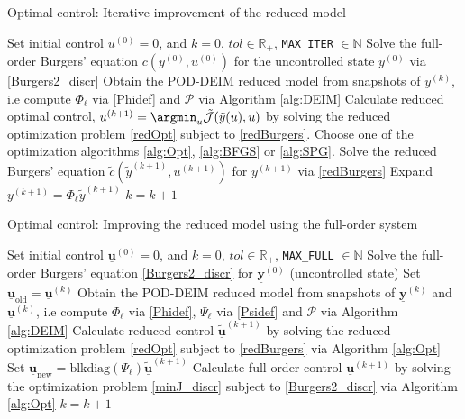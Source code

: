 \begin{algorithm}[H]
\caption{Optimal control: Iterative improvement of the reduced model}
\label{alg:Opt+MOR1}
\begin{algorithmic}[1]
\STATE Set initial control $u^{(0)} = 0$, and $k = 0$, $tol \in \mathbb{R}_+$, \texttt{MAX\_ITER} $\in \mathbb{N}$
\STATE Solve the full-order Burgers' equation $c(y^{(0)},u^{(0)})$ for the uncontrolled state $y^{(0)}$ via \eqref{Burgers2_discr}
\STATE Obtain the POD-DEIM reduced model from snapshots of $y^{(k)}$, i.e compute $\Phi_\ell$ via \eqref{Phidef} and $\mathcal{P}$ via Algorithm \ref{alg:DEIM}
\STATE Calculate reduced optimal control, $u^{(k+1)} = \argmin_u \tilde{\mathcal J}(\tilde{y}(u),u)$ by solving the reduced optimization problem \eqref{redOpt} subject to \eqref{redBurgers}. Choose one of the optimization algorithms \ref{alg:Opt}, \ref{alg:BFGS} or \ref{alg:SPG}.
\STATE Solve the reduced Burgers' equation $\tilde{c}(\tilde{y}^{(k+1)},u^{(k+1)})$ for $y^{(k+1)}$ via \eqref{redBurgers}
\STATE Expand $y^{(k+1)} = \Phi_\ell \tilde{y}^{(k+1)}$
\STATE $k = k + 1$
\ENDWHILE
\end{algorithmic}
\end{algorithm}

\begin{algorithm}[H]
\caption{Optimal control: Improving the reduced model using the full-order system}
\label{alg:Opt+MOR}
\begin{algorithmic}[1]
\STATE Set initial control $\mathbf{\underline{u}}^{(0)} = 0$, and $k = 0$, $tol \in \mathbb{R}_+$, \texttt{MAX\_FULL} $\in \mathbb{N}$
\STATE Solve the full-order Burgers' equation \eqref{Burgers2_discr} for $\mathbf{\underline{y}}^{(0)}$ (uncontrolled state)
\STATE Set $\mathbf{\underline{u}}_{\text{old}} = \mathbf{\underline{u}}^{(k)}$
\STATE Obtain the POD-DEIM reduced model from snapshots of $\mathbf{\underline{y}}^{(k)}$ and $\mathbf{\underline{u}}^{(k)}$, i.e compute $\Phi_\ell$ via \eqref{Phidef}, $\Psi_\ell$ via \eqref{Psidef} and $\mathcal{P}$ via Algorithm \ref{alg:DEIM}
\STATE Calculate reduced control $\mathbf{\underline{\tilde u}}^{(k+1)}$ by solving the reduced optimization problem \eqref{redOpt} subject to \eqref{redBurgers} via Algorithm \ref{alg:Opt}
\STATE Set $\mathbf{\underline{u}}_{\text{new}} = \text{blkdiag}(\Psi_\ell)\mathbf{\underline{\tilde u}}^{(k+1)}$
\RETURN
\ELSE
\STATE Calculate full-order control $\mathbf{\underline{u}}^{(k+1)}$ by solving the optimization problem \eqref{minJ_discr} subject to \eqref{Burgers2_discr} via Algorithm \ref{alg:Opt}
\ENDIF
\STATE $k = k + 1$
\ENDWHILE
\end{algorithmic}
\end{algorithm}

